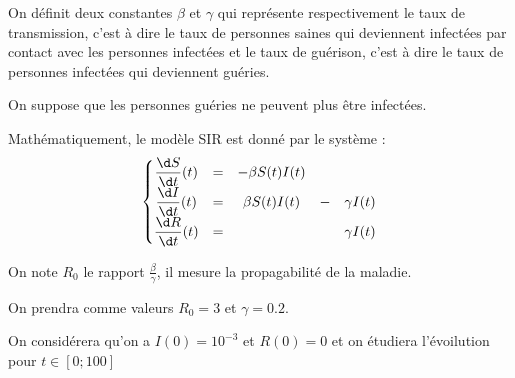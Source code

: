 On définit deux constantes $\beta$ et $\gamma$ qui représente respectivement le taux de transmission, c’est à dire le taux de personnes saines qui deviennent infectées par contact avec les personnes infectées et le taux de guérison, c’est à dire le taux de personnes infectées qui deviennent guéries. 

On suppose que les personnes guéries ne peuvent plus être infectées.

Mathématiquement, le modèle SIR est donné par le système :
\[\left\{
\begin{matrix}
\displaystyle \frac{\d S}{\d t}(t)&=&-\beta S(t)I(t)&&\\ 
\displaystyle \frac{\d I}{\d t}(t)&=&\beta S(t)I(t)&-&\gamma I(t)\\ 
\displaystyle \frac{\d R}{\d t}(t)&=&&&\gamma I(t)\\ 
\end{matrix}\right.\]

On note $R_0$ le rapport $\displaystyle \frac \beta\gamma$, il mesure la propagabilité de la maladie.

On prendra comme valeurs $R_0 = 3$ et $\gamma = 0.2$.

On considérera qu'on a $I(0) = 10^{-3}$ et $R(0) = 0$ et on étudiera l'évoilution pour $t\in [0;100]$


